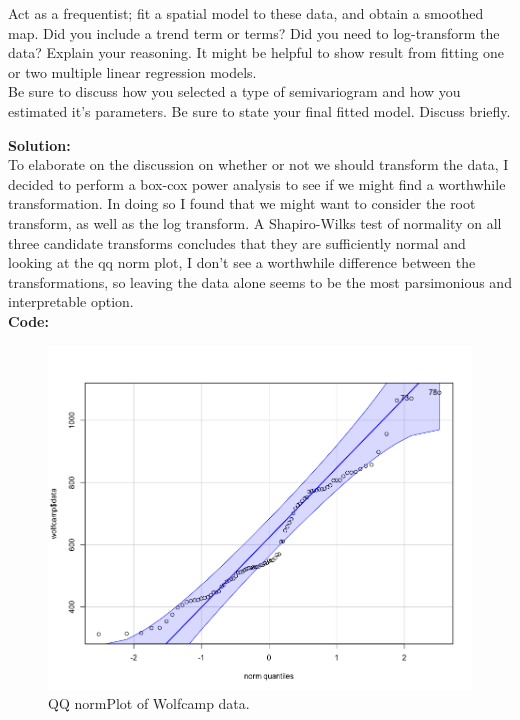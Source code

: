 \documentclass[12pt]{article}
\makeatletter
\theoremstyle{homework}
\newenvironment{exercise}[1]
{\def\@currentlabel{#1}\exercisecore}
{\endexercisecore}
\newcommand{\localhead}[1]{\par\smallskip\noindent\textbf{#1}\nobreak\\}%
\newcommand\solution{\localhead{Solution:}}
\makeatother
\begin{document}
\begin{exercise}{2} Act as a frequentist; fit a spatial model to these data, and obtain a smoothed map. Did you include 
  a trend term or terms? Did you need to log-transform the data? Explain your reasoning. It might be helpful to show result from 
  fitting one or two multiple linear regression models.\\
  Be sure to discuss how you selected a type of semivariogram and how you estimated it's parameters. Be sure to state your final fitted model. 
  Discuss briefly. \\
  \solution To elaborate on the discussion on whether or not we should transform the data, I decided to perform a box-cox power analysis to see if we might find
  a worthwhile transformation. In doing so I found that we might want to consider the root transform, as well as the log transform. A Shapiro-Wilks test of normality on 
  all three candidate transforms concludes that they are sufficiently normal and looking at the qq norm plot, I don't 
  see a worthwhile difference between the transformations, so leaving the data alone seems to be the most parsimonious and interpretable option. \\
  \textbf{Code:}
  \begin{center}
  
  \end{center}
  \begin{figure}[H]
    \begin{center}
      \caption{QQ normPlot of Wolfcamp data.}
    \includegraphics[width = .75\textwidth]{original.png}
    \end{center}
  \end{figure}
  \begin{figure}[H]
    \begin{center}

\end{center}
\end{figure}
\end{exercise}
\end{document}
